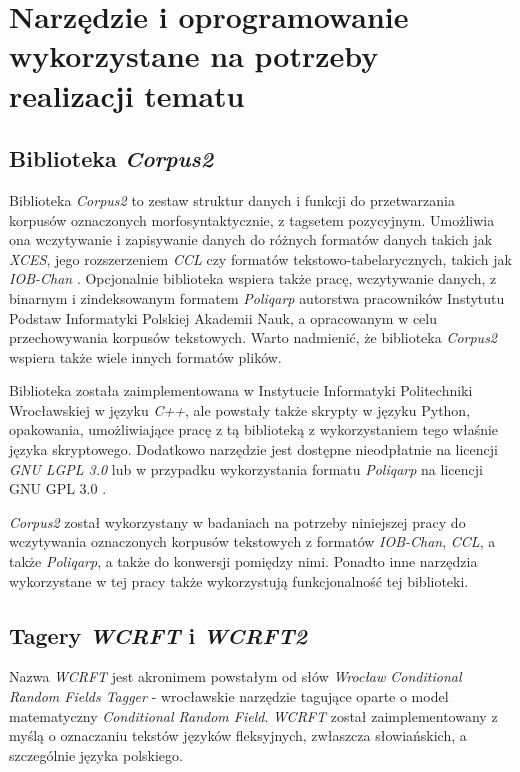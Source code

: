 
\chapter{Narzędzie i oprogramowanie wykorzystane na potrzeby realizacji tematu}


\section{Biblioteka \protect\textit{Corpus2}}
Biblioteka \emph{Corpus2} \cite{corpus2_web} to zestaw struktur danych i funkcji do przetwarzania korpusów oznaczonych morfosyntaktycznie, z tagsetem pozycyjnym. 
Umożliwia ona wczytywanie i zapisywanie danych do różnych formatów danych takich jak \emph{XCES}, jego rozszerzeniem \emph{CCL} \cite{ccl_web} czy formatów tekstowo-tabelarycznych, takich jak \emph{IOB-Chan} \cite{iob_chan_web}.
Opcjonalnie biblioteka wspiera także pracę, wczytywanie danych, z binarnym i zindeksowanym formatem \emph{Poliqarp} \cite{korpus_ipi_pan} autorstwa pracowników Instytutu Podstaw Informatyki Polskiej Akademii Nauk, a opracowanym w celu przechowywania korpusów tekstowych.
Warto nadmienić, że biblioteka \emph{Corpus2} wspiera także wiele innych formatów plików.

\par 
Biblioteka została zaimplementowana w Instytucie Informatyki Politechniki Wrocławskiej w języku \emph{C++}, ale powstały także skrypty w języku Python, opakowania, umożliwiające pracę z tą biblioteką z wykorzystaniem tego właśnie języka skryptowego.
Dodatkowo narzędzie jest dostępne nieodpłatnie na licencji \emph{GNU LGPL 3.0} lub w przypadku wykorzystania formatu \emph{Poliqarp} na licencji GNU GPL 3.0 \cite{corpus2_web}.

\par
\emph{Corpus2} został wykorzystany w badaniach na potrzeby niniejszej pracy do wczytywania oznaczonych korpusów tekstowych z formatów \emph{IOB-Chan}, \emph{CCL}, a także \emph{Poliqarp}, a także do konwersji pomiędzy nimi.
Ponadto inne narzędzia wykorzystane w tej pracy także wykorzystują funkcjonalność tej biblioteki.


\section{Tagery \protect\textit{WCRFT} i \protect\textit{WCRFT2}}
Nazwa \emph{WCRFT} \cite{wcrft_web} jest akronimem powstałym od słów \emph{Wrocław Conditional Random Fields Tagger} - wrocławskie narzędzie tagujące oparte o model matematyczny \emph{Conditional Random Field}.
\emph{WCRFT} został zaimplementowany z myślą o oznaczaniu tekstów języków fleksyjnych, zwłaszcza słowiańskich, a szczególnie języka polskiego.

